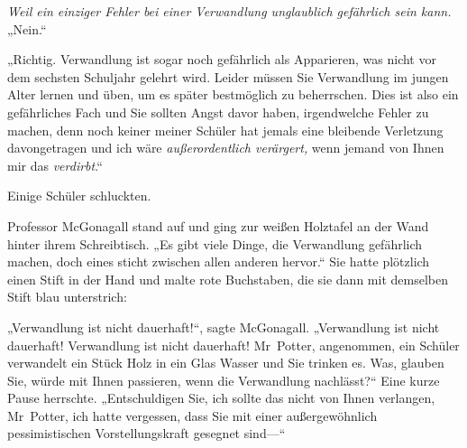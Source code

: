 \emph{Weil ein einziger Fehler bei einer Verwandlung unglaublich gefährlich sein kann.} „Nein.“

„Richtig. Verwandlung ist sogar noch gefährlich als Apparieren, was nicht vor dem sechsten Schuljahr gelehrt wird. Leider müssen Sie Verwandlung im jungen Alter lernen und üben, um es später bestmöglich zu beherrschen. Dies ist also ein gefährliches Fach und Sie sollten Angst davor haben, irgendwelche Fehler zu machen, denn noch keiner meiner Schüler hat jemals eine bleibende Verletzung davongetragen und ich wäre \emph{außerordentlich verärgert,} wenn jemand von Ihnen mir das \emph{verdirbt}.“

Einige Schüler schluckten.

Professor McGonagall stand auf und ging zur weißen Holztafel an der Wand hinter ihrem Schreibtisch. „Es gibt viele Dinge, die Verwandlung gefährlich machen, doch eines sticht zwischen allen anderen hervor.“ Sie hatte plötzlich einen Stift in der Hand und malte rote Buchstaben, die sie dann mit demselben Stift blau unterstrich:


„Verwandlung ist nicht dauerhaft!“, sagte McGonagall. „Verwandlung ist nicht dauerhaft! Verwandlung ist nicht dauerhaft! Mr~Potter, angenommen, ein Schüler verwandelt ein Stück Holz in ein Glas Wasser und Sie trinken es. Was, glauben Sie, würde mit Ihnen passieren, wenn die Verwandlung nachlässt?“ Eine kurze Pause herrschte. „Entschuldigen Sie, ich sollte das nicht von Ihnen verlangen, Mr~Potter, ich hatte vergessen, dass Sie mit einer außergewöhnlich pessimistischen Vorstellungskraft gesegnet sind—“

